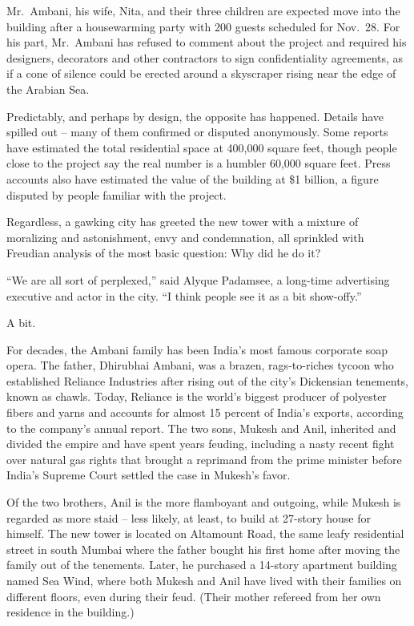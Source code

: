 ﻿\documentclass[12pt]{article}
\begin{document}
Mr.~Ambani, his wife, Nita, and their three children are expected move into the building after a
housewarming party with 200 guests scheduled for Nov.~28. For his part, Mr.~Ambani has refused to
comment about the project and required his designers, decorators and other contractors to sign
confidentiality agreements, as if a cone of silence could be erected around a skyscraper rising near
the edge of the Arabian Sea.

Predictably, and perhaps by design, the opposite has happened. Details have spilled out -- many of
them confirmed or disputed anonymously. Some reports have estimated the total residential space at
400,000 square feet, though people close to the project say the real number is a humbler 60,000
square feet. Press accounts also have estimated the value of the building at \$1 billion, a figure
disputed by people familiar with the project.

Regardless, a gawking city has greeted the new tower with a mixture of moralizing and astonishment,
envy and condemnation, all sprinkled with Freudian analysis of the most basic question: Why did he
do it?

``We are all sort of perplexed,'' said Alyque Padamsee, a long-time advertising executive and actor
in the city. ``I think people see it as a bit show-offy.''

A bit.

For decades, the Ambani family has been India's most famous corporate soap opera. The father,
Dhirubhai Ambani, was a brazen, rags-to-riches tycoon who established Reliance Industries after
rising out of the city's Dickensian tenements, known as chawls. Today, Reliance is the world's
biggest producer of polyester fibers and yarns and accounts for almost 15 percent of India's
exports, according to the company's annual report. The two sons, Mukesh and Anil, inherited and
divided the empire and have spent years feuding, including a nasty recent fight over natural gas
rights that brought a reprimand from the prime minister before India's Supreme Court settled the
case in Mukesh's favor.

Of the two brothers, Anil is the more flamboyant and outgoing, while Mukesh is regarded as more
staid -- less likely, at least, to build at 27-story house for himself. The new tower is located on
Altamount Road, the same leafy residential street in south Mumbai where the father bought his first
home after moving the family out of the tenements. Later, he purchased a 14-story apartment building
named Sea Wind, where both Mukesh and Anil have lived with their families on different floors, even
during their feud. (Their mother refereed from her own residence in the building.)
\end{document}
